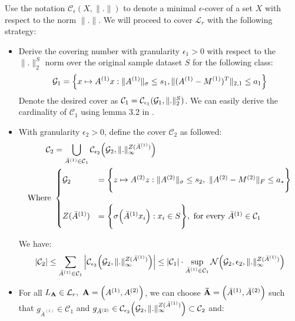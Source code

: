 \noindent Use the notation $\mathcal{C}_\epsilon(X, \|.\|)$ to denote a minimal $\epsilon$-cover of a set $X$ with respect to the norm $\|.\|$. We will proceed to cover $\mathcal{L}_r$ with the following strategy:

\begin{itemize}
    \item Derive the covering number with granularity $\epsilon_1 > 0$ with respect to the $\|.\|_2^S$ norm over the original sample dataset $S$ for the following class: 
    \begin{align*}
        \mathcal{G}_1 = \Big\{ 
            x \mapsto A^{(1)}x : \|A^{(1)}\|_\sigma \le s_1, \|(A^{(1)} - M^{(1)})^T\|_{2, 1} \le a_1
         \Big\} 
    \end{align*}
    Denote the desired cover as $\mathcal{C}_1 = \mathcal{C}_{\epsilon_1}({\mathcal{G}_1}, \|.\|_2^S)$. We can easily derive the cardinality of $\mathcal{C}_1$ using lemma 3.2 in \cite{article:bartlett}.

    \item With granularity $\epsilon_2 > 0$, define the cover $\mathcal{C}_2$ as followed:
    \begin{align*}
       \mathcal{C}_2 &= \bigcup_{\bar A^{(1)} \in \mathcal{C}_1} \mathcal{C}_{\epsilon_2} \bigRound{
            \G_2, \|.\|_\infty^{Z(\bar A^{(1)})}
       } \\
       \text{Where } &\begin{cases}
            \G_2 &= \biggCurl{
                    z \mapsto A^{(2)}z : \|A^{(2)}\|_\sigma \le s_2, \ \|A^{(2)} - M^{(2)}\|_F \le a_*
            } \\ \\
            Z(\bar A^{(1)}) &= \biggCurl{ \sigma\bigRound{\bar A^{(1)}x_i} : x_i \in S }, \ \text{for every } \bar A^{(1)}\in\mathcal{C}_1
       \end{cases}
    \end{align*}

    We have:
    \begin{align*}
        |\mathcal{C}_2| \le \sum_{\bar A^{(1)} \in \mathcal{C}_1} \Big| 
            \mathcal{C}_{\epsilon_2} \Big( 
                \mathcal{G}_2, \|.\|_\infty^{Z(\bar A^{(1)})}
             \Big) 
         \Big| \le |\mathcal{C}_1| \cdot \sup_{\bar A^{(1)} \in \mathcal{C}_1} \mathcal{N}\Big( 
            \mathcal{G}_2, \epsilon_2, \|.\|_\infty^{Z(\bar A^{(1)})}
         \Big)
    \end{align*}

    \item For all $L_\vecbf{A}\in\mathcal{L}_r, \ \vecbf{A}=\Big(A^{(1)}, A^{(2)}\Big)$, we can choose ${\bf \bar A}=\Big( \bar A^{(1)}, \bar A^{(2)} \Big)$ such that $g_{\bar A^{(1)}}\in \mathcal{C}_1$ and $g_{\bar A^{(2)}} \in \mathcal{C}_{\epsilon_2}\Big( \mathcal{G}_2, \|.\|_\infty^{Z(\bar A^{(1)})} \Big)\subset\mathcal{C}_2$ and:


\end{itemize}
